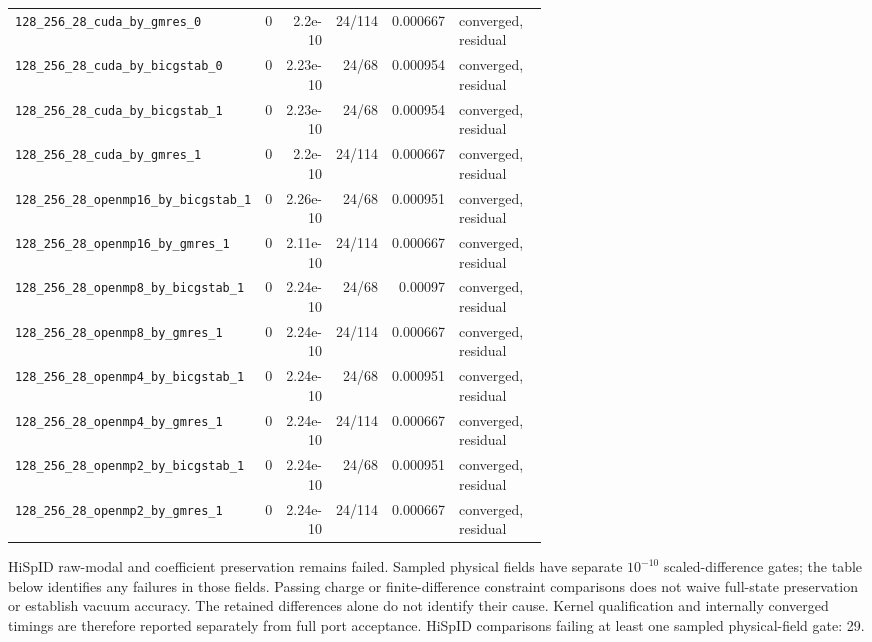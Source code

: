 \documentclass[11pt]{article}
\begin{document}
\begin{longtable}{p{0.40\linewidth}rrrrp{0.22\linewidth}}
\nolinkurl{128_256_28_cuda_by_gmres_0} & 0 & 2.2e-10 & 24/114 & 0.000667 & converged, residual\\
\nolinkurl{128_256_28_cuda_by_bicgstab_0} & 0 & 2.23e-10 & 24/68 & 0.000954 & converged, residual\\
\nolinkurl{128_256_28_cuda_by_bicgstab_1} & 0 & 2.23e-10 & 24/68 & 0.000954 & converged, residual\\
\nolinkurl{128_256_28_cuda_by_gmres_1} & 0 & 2.2e-10 & 24/114 & 0.000667 & converged, residual\\
\nolinkurl{128_256_28_openmp16_by_bicgstab_1} & 0 & 2.26e-10 & 24/68 & 0.000951 & converged, residual\\
\nolinkurl{128_256_28_openmp16_by_gmres_1} & 0 & 2.11e-10 & 24/114 & 0.000667 & converged, residual\\
\nolinkurl{128_256_28_openmp8_by_bicgstab_1} & 0 & 2.24e-10 & 24/68 & 0.00097 & converged, residual\\
\nolinkurl{128_256_28_openmp8_by_gmres_1} & 0 & 2.24e-10 & 24/114 & 0.000667 & converged, residual\\
\nolinkurl{128_256_28_openmp4_by_bicgstab_1} & 0 & 2.24e-10 & 24/68 & 0.000951 & converged, residual\\
\nolinkurl{128_256_28_openmp4_by_gmres_1} & 0 & 2.24e-10 & 24/114 & 0.000667 & converged, residual\\
\nolinkurl{128_256_28_openmp2_by_bicgstab_1} & 0 & 2.24e-10 & 24/68 & 0.000951 & converged, residual\\
\nolinkurl{128_256_28_openmp2_by_gmres_1} & 0 & 2.24e-10 & 24/114 & 0.000667 & converged, residual\\
\bottomrule\end{longtable}\normalsize
HiSpID raw-modal and coefficient preservation remains failed.
Sampled physical fields have separate $10^{-10}$ scaled-difference gates;
the table below identifies any failures in those fields. Passing charge or
finite-difference constraint comparisons does not waive full-state preservation
or establish vacuum accuracy. The retained differences alone do not identify
their cause. Kernel qualification and internally converged timings are therefore
reported separately from full port acceptance.
HiSpID comparisons failing at least one sampled physical-field gate: 29.
\end{document}
